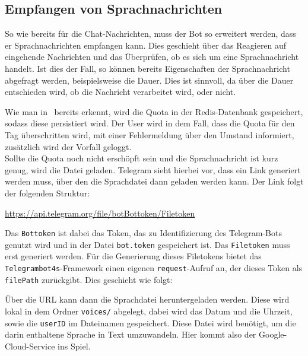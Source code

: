 \subsection{Empfangen von Sprachnachrichten}
So wie bereits für die Chat-Nachrichten, muss der Bot so erweitert werden, dass er Sprachnachrichten empfangen kann. Dies geschieht über das Reagieren auf eingehende Nachrichten und das Überprüfen, ob es sich um eine Sprachnachricht handelt. Ist dies der Fall, so können bereits Eigenschaften der Sprachnachricht abgefragt werden, beispielsweise die Dauer. Dies ist sinnvoll, da über die Dauer entschieden wird, ob die Nachricht verarbeitet wird, oder nicht.
\newpage


Wie man in~ bereits erkennt, wird die Quota in der Redis-Datenbank gespeichert, sodass diese persistiert wird. Der User wird in dem Fall, dass die Quota für den Tag überschritten wird, mit einer Fehlermeldung über den Umstand informiert, zusätzlich wird der Vorfall geloggt. \\
Sollte die Quota noch nicht erschöpft sein und die Sprachnachricht ist kurz genug, wird die Datei geladen. Telegram sieht hierbei vor, dass ein Link generiert werden muss, über den die Sprachdatei dann geladen werden kann. Der Link folgt der folgenden Struktur:

\url{https://api.telegram.org/file/botBottoken/Filetoken}

Das \texttt{Bottoken} ist dabei das Token, das zu Identifizierung des Telegram-Bots genutzt wird und in der Datei \texttt{bot.token} gespeichert ist. Das \texttt{Filetoken} muss erst generiert werden. Für die Generierung dieses Filetokens bietet das \texttt{Telegrambot4s}-Framework einen eigenen \texttt{request}-Aufruf an, der dieses Token als \texttt{filePath} zurückgibt. Dies geschieht wie folgt:



Über die URL kann dann die Sprachdatei heruntergeladen werden. Diese wird lokal in dem Ordner \texttt{voices/} abgelegt, dabei wird das Datum und die Uhrzeit, sowie die \texttt{userID} im Dateinamen gespeichert.
Diese Datei wird benötigt, um die darin enthaltene Sprache in Text umzuwandeln. Hier kommt also der Google-Cloud-Service ins Spiel.

